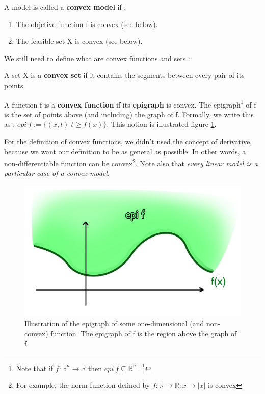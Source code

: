 \documentclass[a4paper]{article}
\begin{document}
\begin{def1}
A model is called a \textbf{convex model} if :
\begin{enumerate}
  \item The objctive function f is convex (see below). 
  \item The feasible set X is convex (see below).
\end{enumerate}
\end{def1}

We still need to define what are convex functions and sets : 

\begin{def1}
    A set X is a \textbf{convex set} if it contains the segments between every pair of its points.
\end{def1}

\begin{def1}
    A function f is a \textbf{convex function} if its \textbf{epigraph} is convex. The epigraph\footnote{Note that if $f : \mathbb{R}^n \to \mathbb{R}$ then $epi \: f \subseteq \mathbb{R}^{n+1}$} of f is the set of points above (and including) the graph of f. Formally, we write this as : $epi \: f := \{(x,t)|t \geq f(x)\} $. This notion is illustrated figure \ref{epi}.
\end{def1}

For the definition of convex functions, we didn't used the concept of derivative, because we want our definition to be as general as possible. In other words, a non-differentiable function can be convex\footnote{For example, the norm function defined by $f:\mathbb{R} \to \mathbb{R}: x \to |x|$ is convex}. Note also that \textit{every linear model is a particular case of a convex model}.\\


\begin{figure}[h!]
\centering
\includegraphics[scale=0.3]{epi}
\caption{Illustration of the epigraph of some one-dimensional (and non-convex) function. The epigraph of f is the region above the graph of f. }
\label{epi}
\end{figure}
\end{document}
